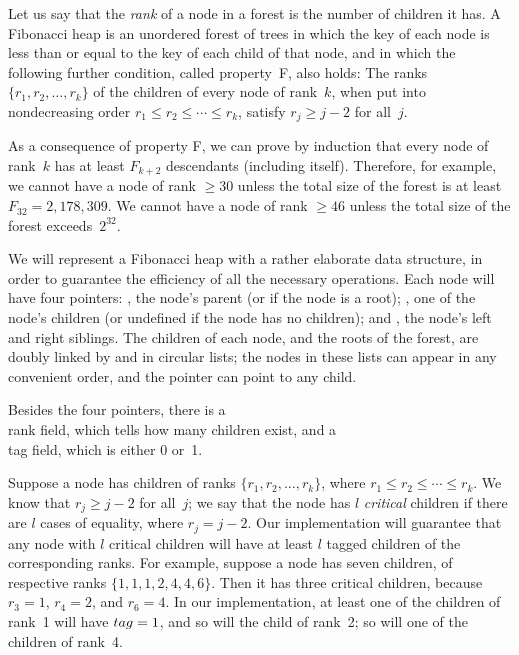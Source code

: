 Let us say that the {\sl rank\/} of a node in a forest is the number
of children it has. A Fibonacci heap is an unordered forest of trees
in which the key of each node is less than or equal to the key of each
child of that node, and in which the following further condition,
called property~F, also holds: The ranks $\{r_1,r_2,\ldots,r_k\}$ of the
children of every node of rank~$k$, when put into nondecreasing
order $r_1\le r_2\le\cdots\le r_k$, satisfy $r_j\ge j-2$ for all~$j$.

As a consequence of property F, we can prove by induction that every
node of rank~$k$ has at least $F_{k+2}$ descendants (including itself).
Therefore, for example, we cannot have a node of rank $\ge30$ unless
the total size of the forest is at least $F_{32}=2{,}178{,}309$. We cannot
have a node of rank $\ge46$ unless the total size of the forest
exceeds~$2^{32}$.

\fi

We will represent a Fibonacci heap with a rather elaborate data
structure,
in order to guarantee the efficiency of all the necessary operations.
Each node will have four pointers: , the node's parent (or
\PB{$\NULL$} if the node is a root); , one of the node's children
(or undefined if the node has no children);  and ,
the
node's left and right siblings. The children of each node, and the
roots of the forest, are doubly linked by  and  in
circular lists; the nodes in these lists can appear in any convenient
order, and the  pointer can point to any child.

Besides the four pointers, there is a \\{rank} field, which tells how
many children exist, and a \\{tag} field, which is either 0 or~1.

Suppose a node has children of ranks $\{r_1,r_2,\ldots,r_k\}$, where
$r_1\le r_2\le\cdots\le r_k$. We know that $r_j\ge j-2$ for all~$j$;
we say that the node has $l$ {\sl critical\/} children if there are
$l$ cases of equality, where $r_j=j-2$. Our implementation will
guarantee that any node with $l$ critical children will have at
least $l$ tagged children of the corresponding ranks. For example,
suppose a node has seven children, of respective ranks $\{1,1,1,2,4,4,6\}$.
Then it has three critical children, because $r_3=1$, $r_4=2$, and
$r_6=4$. In our implementation, at least one of the children of
rank~1 will have $\\{tag}=1$, and so will the child of rank~2; so will
one of the children of rank~4.

